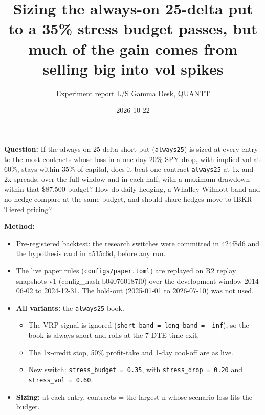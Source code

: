 \documentclass{article}
\title{Sizing the always-on 25-delta put to a 35\% stress budget passes, but much of the gain comes from selling big into vol spikes}
\author{Experiment report \textperiodcentered{} L/S Gamma Desk, QUANTT}
\date{2026-10-22}
\begin{document}
\maketitle

\textbf{Question:} If the always-on 25-delta short put (\texttt{always25}) is sized at every entry to the most contracts whose loss in a one-day 20\% SPY drop, with implied vol at 60\%, stays within 35\% of capital, does it beat one-contract \texttt{always25} at 1x and 2x spreads, over the full window and in each half, with a maximum drawdown within that \$87,500 budget? How do daily hedging, a Whalley-Wilmott band and no hedge compare at the same budget, and should share hedges move to IBKR Tiered pricing?

\textbf{Method:}

\begin{itemize}

\item Pre-registered backtest: the research switches were committed in 424f8d6 and the hypothesis card in a515c6d, before any run.

\item The live paper rules (\texttt{configs/\allowbreak{}paper.\allowbreak{}toml}) are replayed on R2 replay snapshots v1 (config\_hash b040760187f0) over the development window 2014-06-02 to 2024-12-31. The hold-out (2025-01-01 to 2026-07-10) was not used.

\item \textbf{All variants:} the \texttt{always25} book.

\begin{itemize}

\item The VRP signal is ignored (\texttt{short\_\allowbreak{}band = long\_\allowbreak{}band = -\allowbreak{}inf}), so the book is always short and rolls at the 7-DTE time exit.

\item The 1x-credit stop, 50\% profit-take and 1-day cool-off are as live.

\item New switch: \texttt{stress\_\allowbreak{}budget = 0.\allowbreak{}35}, with \texttt{stress\_\allowbreak{}drop = 0.\allowbreak{}20} and \texttt{stress\_\allowbreak{}vol = 0.\allowbreak{}60}.

\end{itemize}

\item \textbf{Sizing:} at each entry, contracts = the largest n whose scenario loss fits the budget.


\end{itemize}
\end{document}
